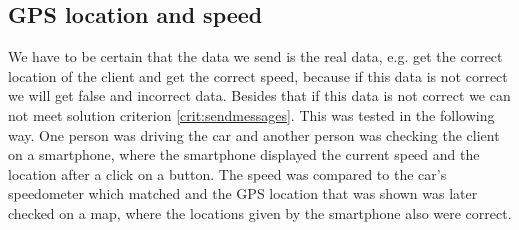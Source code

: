 \subsection{GPS location and speed}
We have to be certain that the data we send is the real data, e.g. get the correct location of the client and get the correct speed, because if this data is not correct we will get false and incorrect data. Besides that if this data is not correct we can not meet solution criterion \ref{crit:sendmessages}. This was tested in the following way.
One person was driving the car and another person was checking the client on a smartphone, where the smartphone displayed the current speed and the location after a click on a button. The speed was compared to the car's speedometer which matched and the GPS location that was shown was later checked on a map, where the locations given by the smartphone also were correct.
\\


